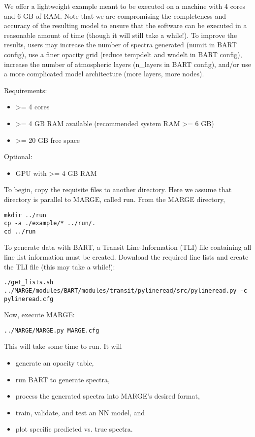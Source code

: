 \documentclass[letterpaper, 12pt]{article}
\begin{document}
We offer a lightweight example meant to be executed on a machine with 4 cores 
and 6 GB of RAM.  Note that we are compromising the completeness and accuracy 
of the resulting model to ensure that the software can be executed in a 
reasonable amount of time (though it will still take a while!).  To improve 
the results, users may increase the number of spectra generated (numit in BART 
config), use a finer opacity grid (reduce tempdelt and wndelt in BART config), 
increase the number of atmospheric layers (n\_layers in BART config), and/or 
use a more complicated model architecture (more layers, more nodes).

\noindent Requirements:
\begin{itemize}
\item \textgreater= 4 cores
\item \textgreater= 4 GB RAM available (recommended system RAM \textgreater= 6 GB)
\item \textgreater= 20 GB free space
\end{itemize}

\noindent Optional:
\begin{itemize}
\item GPU with \textgreater= 4 GB RAM
\end{itemize}

\noindent To begin, copy the requisite files to another directory.  Here we 
assume that directory is parallel to MARGE, called run.  From the MARGE 
directory,
\begin{verbatim}
mkdir ../run
cp -a ./example/* ../run/.
cd ../run
\end{verbatim}

\noindent To generate data with BART, a Transit Line-Information (TLI) file 
containing all line list information must be created.  Download the required 
line lists and create the TLI file (this may take a while!):
\begin{verbatim}
./get_lists.sh
../MARGE/modules/BART/modules/transit/pylineread/src/pylineread.py -c pylineread.cfg
\end{verbatim}

\noindent Now, execute MARGE:
\begin{verbatim}
../MARGE/MARGE.py MARGE.cfg
\end{verbatim}

\noindent This will take some time to run.  It will 

\begin{itemize}
\item generate an opacity table,
\item run BART to generate spectra,
\item process the generated spectra into MARGE's desired format,
\item train, validate, and test an NN model, and
\item plot specific predicted vs. true spectra.
\end{itemize}
\end{document}
